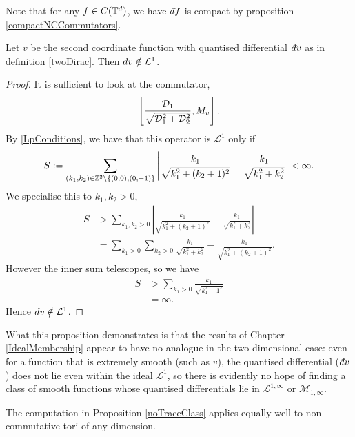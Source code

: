 Note that for any $f \in C(\mathbb{T}^d)$, we have $\qd f$ is compact
by proposition \ref{compactNCCommutators}.



\begin{proposition}
\label{noTraceClass}
    Let $v$ be the second coordinate function with quantised differential
    $\qd v$ as in definition \ref{twoDirac}. Then $\qd v \notin \mathcal{L}^1$.
\end{proposition}
\begin{proof}
    It is sufficient to look at the commutator,
    \begin{equation}
        \left[\frac{\mathcal{D}_1}{\sqrt{\mathcal{D}_1^2+\mathcal{D}_2^2}},M_v\right].
    \end{equation}
    By \ref{LpConditions}, we have that this operator is $\mathcal{L}^1$
     only if
    \begin{equation}
        S := \sum_{(k_1,k_2)\in\mathbb{Z}^2\setminus \{(0,0),(0,-1)\}} \left|\frac{k_1}{\sqrt{k_1^2+(k_2+1)^2}}-\frac{k_1}{\sqrt{k_1^2+k_2^2}}\right| < \infty.
    \end{equation}
    We specialise this to $k_1,k_2 > 0$,
    \begin{align}
        S &> \sum_{k_1,k_2 > 0} \left|\frac{k_1}{\sqrt{k_1^2+(k_2+1)^2}}-\frac{k_1}{\sqrt{k_1^2+k_2^2}}\right|\\
        &= \sum_{k_1 > 0}\sum_{k_2 > 0} \frac{k_1}{\sqrt{k_1^2+k_2^2}}-\frac{k_1}{\sqrt{k_1^2+(k_2+1)^2}}. 
    \end{align}
    However the inner sum telescopes, so we have
    \begin{align}
        S &> \sum_{k_1 > 0} \frac{k_1}{\sqrt{k_1^2+1^2}}\\
        &= \infty.
    \end{align}
    Hence $\qd v \notin \mathcal{L}^1$. 
\end{proof}
What this proposition demonstrates is that the results
of Chapter \ref{IdealMembership} appear to have no analogue
in the two dimensional case: even for a function that is extremely smooth (such as
$v$), the quantised differential ($\qd v$) does not lie even within
the ideal $\mathcal{L}^1$, so there is evidently no hope 
of finding a class of smooth functions whose quantised differentials
lie in $\mathcal{L}^{1,\infty}$ or $\mathcal{M}_{1,\infty}$.

\begin{remark}
    The computation in Proposition \ref{noTraceClass} applies equally
    well to non-commutative tori of any dimension. 
\end{remark}

